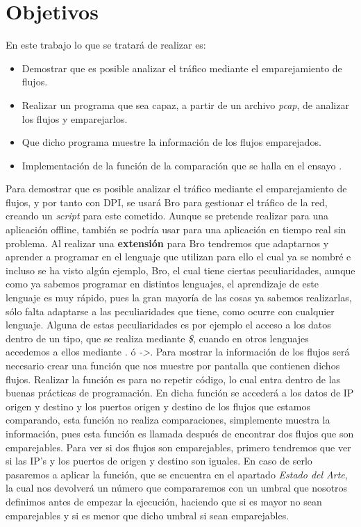 \chapter{Objetivos}
En este trabajo lo que se tratará de realizar es:
\begin{itemize}
\item Demostrar que es posible analizar el tráfico mediante el emparejamiento de flujos.
\item Realizar un programa que sea capaz, a partir de un archivo \textit{pcap}, de analizar los flujos y emparejarlos.
\item Que dicho programa muestre la información de los flujos emparejados.
\item Implementación de la función de la comparación que se halla en el ensayo \cite{comparacion}.
\end{itemize}

Para demostrar que es posible analizar el tráfico mediante el emparejamiento 
de flujos, y por tanto con DPI, se usará Bro para gestionar el tráfico de 
la red, creando un \textit{script} para este cometido. Aunque se pretende 
realizar para una aplicación offline, también se podría usar para una 
aplicación en tiempo real sin problema.
\intro
Al realizar una \textbf{extensión} para Bro tendremos que adaptarnos y aprender a 
programar en el lenguaje que utilizan para ello el cual ya se nombré e incluso se ha visto algún ejemplo, 
Bro, el cual tiene ciertas peculiaridades, aunque como ya sabemos 
programar en distintos lenguajes, el 
aprendizaje de este lenguaje es muy rápido, pues la gran mayoría de las cosas 
ya sabemos realizarlas, sólo falta adaptarse a las peculiaridades que tiene, como ocurre con 
cualquier lenguaje. Alguna de estas peculiaridades es por ejemplo el acceso a 
los datos dentro de un tipo, que se realiza mediante \textit{\$}, cuando en otros 
lenguajes accedemos a ellos mediante \textit{.} ó \textit{->}.
\intro
Para mostrar la información de los flujos será necesario crear una función 
que nos muestre por pantalla que contienen dichos flujos. Realizar la función 
es para no repetir código, lo cual entra dentro de las buenas prácticas de 
programación. En dicha función se accederá a los datos de IP origen y 
destino y los puertos origen y destino de los flujos que estamos comparando, 
esta función no realiza comparaciones, simplemente muestra la información, 
pues esta función es llamada después de encontrar dos flujos que son emparejables.
\intro
Para ver si dos flujos son emparejables, primero tendremos que ver si las IP’s 
y los puertos de origen y destino son iguales. En caso de serlo pasaremos a 
aplicar la función, que se encuentra en el apartado \textit{Estado del Arte}, la cual nos devolverá 
un número que compararemos con un umbral que nosotros definimos antes de empezar la ejecución, haciendo que 
si es mayor no sean emparejables y si es menor que dicho umbral si sean emparejables.